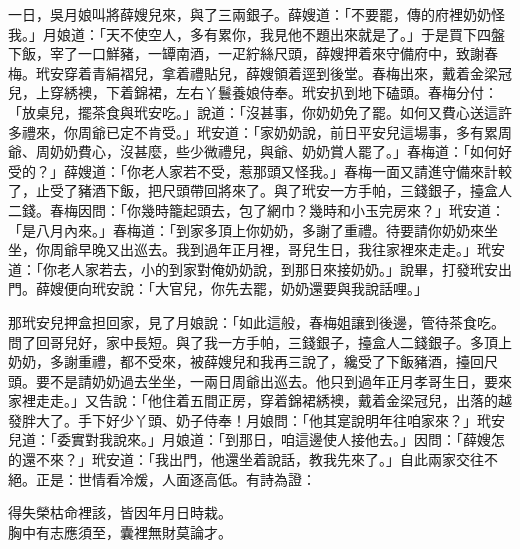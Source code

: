 一日，吳月娘叫將薛嫂兒來，與了三兩銀子。{}薛嫂道：「不要罷，傳的府裡奶奶怪我。」月娘道：「天不使空人，多有累你，我見他不題出來就是了。」于是買下四盤下飯，宰了一口鮮豬，一罈南酒，一疋紵絲尺頭，薛嫂押着來守備府中，致謝春梅。玳安穿着青絹褶兒，拿着禮貼兒，薛嫂領着逕到後堂。春梅出來，戴着金梁冠兒，上穿綉襖，下着錦裙，左右丫鬟養娘侍奉。玳安扒到地下磕頭。春梅分付：「放桌兒，擺茶食與玳安吃。」說道：「沒甚事，你奶奶免了罷。如何又費心送這許多禮來，你周爺已定不肯受。」玳安道：「家奶奶說，前日平安兒這場事，多有累周爺、周奶奶費心，沒甚麼，些少微禮兒，與爺、奶奶賞人罷了。」春梅道：「如何好受的？」薛嫂道：「你老人家若不受，惹那頭又怪我。」春梅一面又請進守備來計較了，止受了豬酒下飯，把尺頭帶回將來了。與了玳安一方手帕，三錢銀子，擡盒人二錢。春梅因問：「你幾時籠起頭去，包了網巾？幾時和小玉完房來？」{}玳安道：「是八月內來。」春梅道：「到家多頂上你奶奶，多謝了重禮。待要請你奶奶來坐坐，你周爺早晚又出巡去。我到過年正月裡，哥兒生日，我往家裡來走走。」玳安道：「你老人家若去，小的到家對俺奶奶說，到那日來接奶奶。」說畢，打發玳安出門。薛嫂便向玳安說：「大官兒，你先去罷，奶奶還要與我說話哩。」

那玳安兒押盒担回家，見了月娘說：「如此這般，春梅姐讓到後邊，管待茶食吃。問了回哥兒好，家中長短。與了我一方手帕，三錢銀子，擡盒人二錢銀子。多頂上奶奶，多謝重禮，都不受來，被薛嫂兒和我再三說了，纔受了下飯豬酒，擡回尺頭。要不是請奶奶過去坐坐，一兩日周爺出巡去。他只到過年正月孝哥生日，要來家裡走走。」又告說：「他住着五間正房，穿着錦裙綉襖，戴着金梁冠兒，出落的越發胖大了。手下好少丫頭、奶子侍奉！月娘問：「他其寔說明年往咱家來？」{}玳安兒道：「委實對我說來。」月娘道：「到那日，咱這邊使人接他去。」因問：「薛嫂怎的還不來？」玳安道：「我出門，他還坐着說話，教我先來了。」自此兩家交往不絕。正是：世情看冷煖，人面逐高低。有詩為證：

\begin{myquote}
得失榮枯命裡該，皆因年月日時栽。\\胸中有志應須至，囊裡無財莫論才。
\end{myquote}


